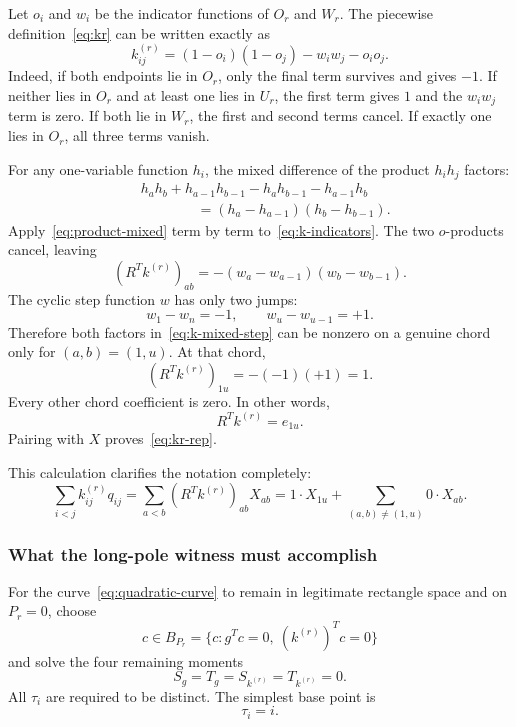 \documentclass[11pt]{article}
\theoremstyle{definition}
\begin{document}
Let $o_i$ and $w_i$ be the indicator functions of $O_r$ and $W_r$.  The piecewise definition~\eqref{eq:kr} can be written exactly as
\begin{equation}
k^{(r)}_{ij}
=(1-o_i)(1-o_j)-w_iw_j-o_io_j.
\label{eq:k-indicators}
\end{equation}
Indeed, if both endpoints lie in $O_r$, only the final term survives and gives $-1$.  If neither lies in $O_r$ and at least one lies in $U_r$, the first term gives $1$ and the $w_iw_j$ term is zero.  If both lie in $W_r$, the first and second terms cancel.  If exactly one lies in $O_r$, all three terms vanish.

For any one-variable function $h_i$, the mixed difference of the product $h_ih_j$ factors:
\begin{align}
&h_ah_b+h_{a-1}h_{b-1}-h_ah_{b-1}-h_{a-1}h_b\\
&\hspace{4em}=(h_a-h_{a-1})(h_b-h_{b-1}).
\label{eq:product-mixed}
\end{align}
Apply~\eqref{eq:product-mixed} term by term to~\eqref{eq:k-indicators}.  The two $o$-products cancel, leaving
\begin{equation}
(R^Tk^{(r)})_{ab}
=-(w_a-w_{a-1})(w_b-w_{b-1}).
\label{eq:k-mixed-step}
\end{equation}
The cyclic step function $w$ has only two jumps:
\[
w_1-w_n=-1,
\qquad
w_u-w_{u-1}=+1.
\]
Therefore both factors in~\eqref{eq:k-mixed-step} can be nonzero on a genuine chord only for $(a,b)=(1,u)$.  At that chord,
\[
(R^Tk^{(r)})_{1u}=-(-1)(+1)=1.
\]
Every other chord coefficient is zero.  In other words,
\begin{equation}
R^Tk^{(r)}=e_{1u}.
\label{eq:RTkr-delta}
\end{equation}
Pairing with $X$ proves~\eqref{eq:kr-rep}.

This calculation clarifies the notation completely:
\[
\sum_{i<j}k^{(r)}_{ij}q_{ij}
=\sum_{a<b}(R^Tk^{(r)})_{ab}X_{ab}
=1\cdot X_{1u}+\sum_{(a,b)\neq(1,u)}0\cdot X_{ab}.
\]

\subsubsection{What the long-pole witness must accomplish}

For the curve~\eqref{eq:quadratic-curve} to remain in legitimate rectangle space and on $P_r=0$, choose
\begin{equation}
c\in B_{P_r}
=\{c:g^Tc=0,\ (k^{(r)})^Tc=0\}
\label{eq:BPr}
\end{equation}
and solve the four remaining moments
\begin{equation}
S_g=T_g=S_{k^{(r)}}=T_{k^{(r)}}=0.
\label{eq:long-four}
\end{equation}
All $\tau_i$ are required to be distinct.  The simplest base point is
\begin{equation}
\tau_i=i.
\label{eq:long-nodes}
\end{equation}
\end{document}
